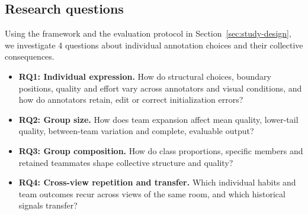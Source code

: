 \subsection{Research questions}
\label{sec:research-questions}
Using the framework and the evaluation protocol in Section~\ref{sec:study-design}, we investigate 4 questions about individual annotation choices and their collective consequences.

\begin{itemize}
\item \textbf{RQ1: Individual expression.} How do structural choices, boundary positions, quality and effort vary across annotators and visual conditions, and how do annotators retain, edit or correct initialization errors?
\item \textbf{RQ2: Group size.} How does team expansion affect mean quality, lower-tail quality, between-team variation and complete, evaluable output?
\item \textbf{RQ3: Group composition.} How do class proportions, specific members and retained teammates shape collective structure and quality?
\item \textbf{RQ4: Cross-view repetition and transfer.} Which individual habits and team outcomes recur across views of the same room, and which historical signals transfer?
\end{itemize}
